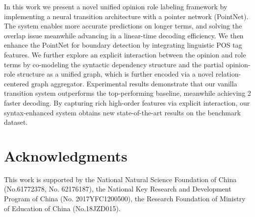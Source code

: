 \documentclass[letterpaper]{article} \usepackage{aaai22}  \usepackage{times}  \usepackage{helvet}  \usepackage{courier}  \usepackage[hyphens]{url}  \usepackage{graphicx} \urlstyle{rm} \def\UrlFont{\rm}  \usepackage{natbib}  \usepackage{caption} \DeclareCaptionStyle{ruled}{labelfont=normalfont,labelsep=colon,strut=off} \frenchspacing  \setlength{\pdfpagewidth}{8.5in}  \setlength{\pdfpageheight}{11in}  \usepackage{algorithm}
\begin{document}
In this work we present a novel unified opinion role labeling framework by implementing a neural transition architecture with a pointer network (PointNet).
The system enables more accurate predictions on longer terms, and solving the overlap issue meanwhile advancing in a linear-time decoding efficiency.
We then enhance the PointNet for boundary detection by integrating linguistic POS tag features.
We further explore an explicit interaction between the opinion and role terms by co-modeling the syntactic dependency structure and the partial opinion-role structure as a unified graph, which is further encoded via a novel relation-centered graph aggregator.
Experimental results demonstrate that our vanilla transition system outperforms the top-performing baseline, meanwhile achieving 2 faster decoding.
By capturing rich high-order features via explicit interaction, our syntax-enhanced system obtains new state-of-the-art results on the benchmark dataset.










\newpage

\section*{Acknowledgments}

This work is supported by the National Natural Science Foundation of China (No.61772378, No. 62176187), 
the National Key Research and Development Program of China (No. 2017YFC1200500), 
the Research Foundation of Ministry of Education of China (No.18JZD015).









\end{document}
